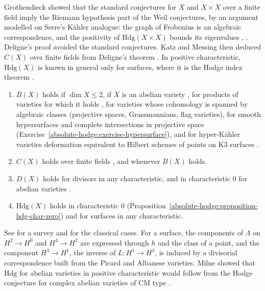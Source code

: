 \begin{remark}\label{absolute-hodge:remark-grothendieck-plan}
Grothendieck showed that the standard conjectures for $X$ and $X \times X$ over a finite field imply the Riemann hypothesis part of the Weil conjectures, by an argument modelled on Serre's K\"ahler analogue:
the graph of Frobenius is an algebraic correspondence, and the positivity of $\mathrm{Hdg}(X \times X)$ bounds its eigenvalues \cite{grothendieck-standard}, \cite{kleiman-1968}. Deligne's proof
\cite{deligne-weil-1} avoided the standard conjectures. Katz and Messing then deduced $C(X)$ over finite fields from Deligne's theorem \cite{katz-messing-1974}. In positive characteristic,
$\mathrm{Hdg}(X)$ is known in general only for surfaces, where it is the Hodge index theorem \cite[Theorem V.1.9]{hartshorne-ag}.
\end{remark}

\begin{theorem}\label{absolute-hodge:theorem-known-standard-conjectures}
\begin{enumerate}
\item $B(X)$ holds if $\dim X \leq 2$, if $X$ is an abelian variety \cite{lieberman-1968}, for products of varieties for which it holds \cite{kleiman-1968}, for varieties whose cohomology is spanned by algebraic
classes (projective spaces, Grassmannians, flag varieties), for smooth hypersurfaces and complete intersections in projective space (Exercise~\ref{absolute-hodge:exercise-hypersurface}), and for hyper-K\"ahler varieties
deformation equivalent to Hilbert schemes of points on K3 surfaces \cite{charles-markman-2013}.
\item $C(X)$ holds over finite fields \cite{katz-messing-1974}, and whenever $B(X)$ holds.
\item $D(X)$ holds for divisors in any characteristic, and in characteristic $0$ for abelian varieties \cite{lieberman-1968}.
\item $\mathrm{Hdg}(X)$ holds in characteristic $0$ (Proposition~\ref{absolute-hodge:proposition-hdg-char-zero}) and for surfaces in any characteristic.
\end{enumerate}
\end{theorem}

See \cite{kleiman-1994} for a survey and for the classical cases. For a surface, the components of $\Lambda$ on $H^2 \to H^0$ and $H^4 \to H^2$ are expressed through $h$ and the class of a point, and
the component $H^3 \to H^1$, the inverse of $L \colon H^1 \to H^3$, is induced by a divisorial correspondence built from the Picard and Albanese varieties. Milne showed that $\mathrm{Hdg}$ for abelian
varieties in positive characteristic would follow from the Hodge conjecture for complex abelian varieties of CM type \cite{milne-2002}.

